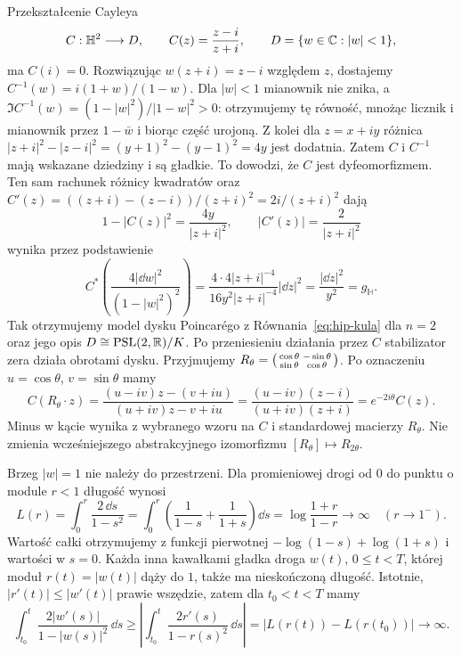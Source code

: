 \begin{przyklad}
Przekształcenie Cayleya
\[
 C:\mathbb H^2\longrightarrow D,
 \qquad C(z)=\frac{z-i}{z+i},\qquad
 D=\{w\in\mathbb{C}:|w|<1\},
\]
ma $C(i)=0$. Rozwiązując $w(z+i)=z-i$ względem $z$,
dostajemy $C^{-1}(w)=i(1+w)/(1-w)$.
Dla $|w|<1$ mianownik nie znika, a
$\Im C^{-1}(w)=(1-|w|^2)/|1-w|^2>0$:
otrzymujemy tę równość, mnożąc licznik i mianownik
przez $1-\bar w$ i biorąc część urojoną.
Z kolei dla $z=x+iy$ różnica
$|z+i|^2-|z-i|^2=(y+1)^2-(y-1)^2=4y$ jest dodatnia.
Zatem $C$ i $C^{-1}$ mają wskazane dziedziny i są gładkie.
To dowodzi, że $C$ jest dyfeomorfizmem.
Ten sam rachunek różnicy kwadratów oraz
$C'(z)=((z+i)-(z-i))/(z+i)^2=2i/(z+i)^2$ dają
\[
 1-|C(z)|^2=\frac{4y}{|z+i|^2},
 \qquad |C'(z)|=\frac2{|z+i|^2}
\]
wynika przez podstawienie
\[
 C^*\!\left(\frac{4|\dd w|^2}{(1-|w|^2)^2}\right)
 =\frac{4\cdot4|z+i|^{-4}}{16y^2|z+i|^{-4}}|\dd z|^2
 =\frac{|\dd z|^2}{y^2}=g_{\mathbb H}.
\]
Tak otrzymujemy model dysku Poincarégo z
Równania~\eqref{eq:hip-kula} dla $n=2$ oraz jego
opis $D\cong\mathrm{PSL}(2,\mathbb{R})/K$.
Po przeniesieniu działania przez $C$ stabilizator
zera działa obrotami dysku.
Przyjmujemy $R_\theta=
 \begin{psmallmatrix}\cos\theta&-\sin\theta\\
\sin\theta&\cos\theta\end{psmallmatrix}$.
Po oznaczeniu $u=\cos\theta$, $v=\sin\theta$ mamy
\[
 C(R_\theta\cdot z)
 =\frac{(u-iv)z-(v+iu)}{(u+iv)z-v+iu}
 =\frac{(u-iv)(z-i)}{(u+iv)(z+i)}
 =e^{-2i\theta}C(z).
\]
Minus w kącie wynika z wybranego wzoru na $C$
i standardowej macierzy $R_\theta$.
Nie zmienia wcześniejszego abstrakcyjnego izomorfizmu
$[R_\theta]\mapsto R_{2\theta}$.

Brzeg $|w|=1$ nie należy do przestrzeni.
Dla promieniowej drogi od $0$ do punktu o module $r<1$
długość wynosi
\[
 L(r)=\int_0^r\frac{2\,\dd s}{1-s^2}
 =\int_0^r\left(\frac1{1-s}+\frac1{1+s}\right)\dd s
 =\log\frac{1+r}{1-r}\longrightarrow\infty
 \quad(r\to1^-).
\]
Wartość całki otrzymujemy z funkcji pierwotnej
$-\log(1-s)+\log(1+s)$ i wartości w $s=0$.
Każda inna kawałkami gładka droga $w(t)$, $0\leq t<T$,
której moduł $r(t)=|w(t)|$ dąży do $1$, także ma
nieskończoną długość. Istotnie, $|r'(t)|\leq|w'(t)|$
prawie wszędzie, zatem dla $t_0<t<T$ mamy
\[
 \int_{t_0}^{t}\frac{2|w'(s)|}{1-|w(s)|^2}\,\dd s
 \geq\left|\int_{t_0}^{t}\frac{2r'(s)}{1-r(s)^2}\,\dd s\right|
 =|L(r(t))-L(r(t_0))|\longrightarrow\infty.
\]
\end{przyklad}

